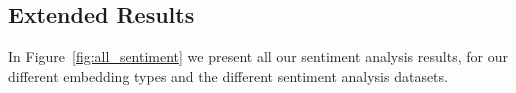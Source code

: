 \subsection{Extended Results}
\label{app:experiment_results}
In Figure~\ref{fig:all_sentiment} we present all our sentiment analysis results, for our different embedding types and the different sentiment analysis datasets.
